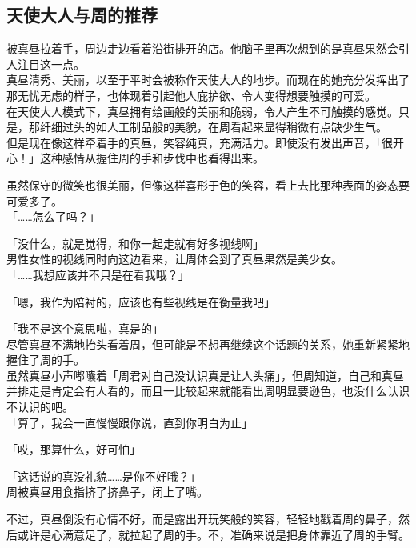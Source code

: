 \subsection{天使大人与周的推荐}

被真昼拉着手，周边走边看着沿街排开的店。他脑子里再次想到的是真昼果然会引人注目这一点。\\

真昼清秀、美丽，以至于平时会被称作天使大人的地步。而现在的她充分发挥出了那无忧无虑的样子，也体现着引起他人庇护欲、令人变得想要触摸的可爱。\\

在天使大人模式下，真昼拥有绘画般的美丽和脆弱，令人产生不可触摸的感觉。只是，那纤细过头的如人工制品般的美貌，在周看起来显得稍微有点缺少生气。\\

但是现在像这样牵着手的真昼，笑容纯真，充满活力。即使没有发出声音，「很开心！」这种感情从握住周的手和步伐中也看得出来。

虽然保守的微笑也很美丽，但像这样喜形于色的笑容，看上去比那种表面的姿态要可爱多了。\\

「……怎么了吗？」

「没什么，就是觉得，和你一起走就有好多视线啊」\\

男性女性的视线同时向这边看来，让周体会到了真昼果然是美少女。\\

「……我想应该并不只是在看我哦？」

「嗯，我作为陪衬的，应该也有些视线是在衡量我吧」

「我不是这个意思啦，真是的」\\

尽管真昼不满地抬头看着周，但可能是不想再继续这个话题的关系，她重新紧紧地握住了周的手。\\

虽然真昼小声嘟囔着「周君对自己没认识真是让人头痛」，但周知道，自己和真昼并排走是肯定会有人看的，而且一比较起来就能看出周明显要逊色，也没什么认识不认识的吧。\\

「算了，我会一直慢慢跟你说，直到你明白为止」

「哎，那算什么，好可怕」

「这话说的真没礼貌……是你不好哦？」\\

周被真昼用食指挤了挤鼻子，闭上了嘴。

不过，真昼倒没有心情不好，而是露出开玩笑般的笑容，轻轻地戳着周的鼻子，然后或许是心满意足了，就拉起了周的手。不，准确来说是把身体靠近了周的手臂。\\

